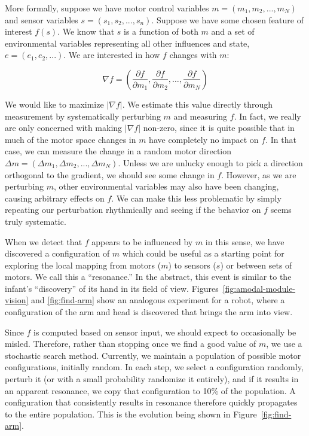 More formally, suppose we have motor control variables
$m=(m_1,m_2,...,m_N)$ and sensor variables $s=(s_1,s_2,...,s_n)$.
Suppose we have some chosen feature of interest $f(s)$.  We know that
$s$ is a function of both $m$ and a set of environmental variables
representing all other influences and state, $e=(e_1,e_2,...)$.
We are interested in how $f$ changes with $m$:

\begin{equation}
\nabla f  = \left(\frac{\partial f}{\partial m_1 }, \frac{\partial f}{\partial m_2 }, \dots,  \frac{\partial f}{\partial m_N }  \right)
\end{equation}

We would like to maximize $|\nabla{}f|$.  We estimate this value
directly through measurement by systematically perturbing $m$ and
measuring $f$.
%
In fact, we really are only concerned with making $|\nabla{}f|$ 
non-zero, since it is quite possible that in much of the motor space 
changes in $m$ have completely no impact on $f$.
%
In that case, we can measure the change in a random motor 
direction $\Delta{}m=(\Delta{}m_1,\Delta{}m_2,...,\Delta{}m_N)$.
%
Unless we are unlucky enough to pick a direction orthogonal to 
the gradient, we should see some change in $f$.
%
However, as we are perturbing $m$, other environmental variables
may also have been changing, causing arbitrary effects on $f$.
We can make this less problematic by simply repeating our perturbation
rhythmically and seeing if the behavior on $f$ seems truly
systematic.

When we detect that $f$ appears to be influenced by $m$ in this
sense, we have discovered a configuration of $m$ which could
be useful as a starting point for exploring the local mapping
from motors ($m$) to sensors ($s$) or between sets of motors.
We call this a ``resonance.''
In the abstract, this event is similar to the 
infant's ``discovery'' of its hand in its field of view.
Figures~\ref{fig:amodal-module-vision} and \ref{fig:find-arm}
show an analogous experiment for a robot, where a configuration
of the arm and head
is discovered that brings the arm into view.

Since $f$ is computed based on sensor input, we should
expect to occasionally be misled.  Therefore, rather 
than stopping once we find a good value of $m$, we use
a stochastic search method.  
%
Currently, we maintain a population of possible motor configurations,
initially random.  In each step, we select a configuration randomly,
perturb it (or with a small probability randomize it entirely), and if
it results in an apparent resonance, we copy that configuration to 10\%
of the population.
%
A configuration that consistently results in resonance therefore quickly 
propagates to the entire population.
%
This is the evolution being shown in Figure~\ref{fig:find-arm}.

